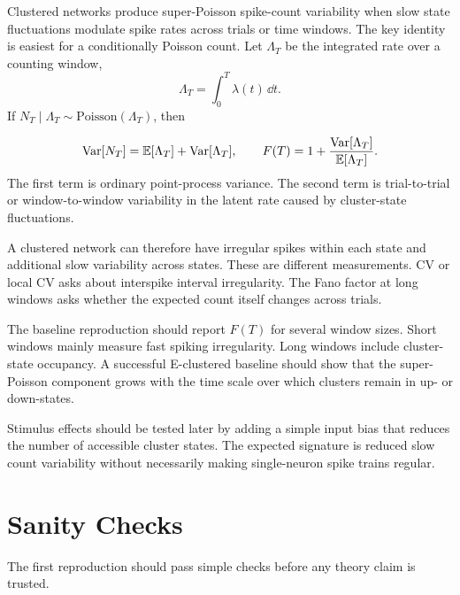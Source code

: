 Clustered networks produce super-Poisson spike-count variability when slow state fluctuations modulate spike rates across trials or time windows. The key identity is easiest for a conditionally Poisson count. Let $\Lambda_T$ be the integrated rate over a counting window,
%
\begin{equation}
  \Lambda_T=\int_0^T \lambda(t)\,\dd t .
  \label{eq:integrated-latent-rate}
\end{equation}
%
If $N_T\mid \Lambda_T\sim\mathrm{Poisson}(\Lambda_T)$, then
%
\begin{keyequation}
\begin{equation}
  \operatorname{Var}[N_T]
  =
  \mathbb{E}[\Lambda_T]
  +
  \operatorname{Var}[\Lambda_T],
  \qquad
  F(T)
  =
  1+\frac{\operatorname{Var}[\Lambda_T]}{\mathbb{E}[\Lambda_T]} .
  \label{eq:fano-latent-rate-decomposition}
\end{equation}
\tcblower
The first term is ordinary point-process variance. The second term is trial-to-trial or window-to-window variability in the latent rate caused by cluster-state fluctuations.
\end{keyequation}

\noindent A clustered network can therefore have irregular spikes within each state and additional slow variability across states. These are different measurements. CV or local CV asks about interspike interval irregularity. The Fano factor at long windows asks whether the expected count itself changes across trials.

The baseline reproduction should report $F(T)$ for several window sizes. Short windows mainly measure fast spiking irregularity. Long windows include cluster-state occupancy. A successful E-clustered baseline should show that the super-Poisson component grows with the time scale over which clusters remain in up- or down-states.

Stimulus effects should be tested later by adding a simple input bias that reduces the number of accessible cluster states. The expected signature is reduced slow count variability without necessarily making single-neuron spike trains regular.

\section{Sanity Checks}
\label{sec:baseline-sanity-checks}

The first reproduction should pass simple checks before any theory claim is trusted.

